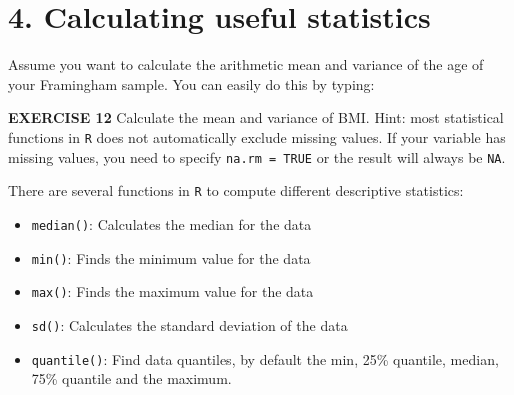 \documentclass[
]{article}
\newenvironment{Shaded}{\begin{snugshade}}{\end{snugshade}}
\newcommand{\CommentTok}[1]{\textcolor[rgb]{0.56,0.35,0.01}{\textit{#1}}}
\newcommand{\DataTypeTok}[1]{\textcolor[rgb]{0.13,0.29,0.53}{#1}}
\newcommand{\KeywordTok}[1]{\textcolor[rgb]{0.13,0.29,0.53}{\textbf{#1}}}
\newcommand{\NormalTok}[1]{#1}
\newcommand{\OperatorTok}[1]{\textcolor[rgb]{0.81,0.36,0.00}{\textbf{#1}}}
\newcommand{\OtherTok}[1]{\textcolor[rgb]{0.56,0.35,0.01}{#1}}
\providecommand{\tightlist}{%
  \setlength{\itemsep}{0pt}\setlength{\parskip}{0pt}}
\begin{document}
\hypertarget{calculating-useful-statistics}{%
\section{4. Calculating useful
statistics}\label{calculating-useful-statistics}}

Assume you want to calculate the arithmetic mean and variance of the age
of your Framingham sample. You can easily do this by typing:

\begin{Shaded}
\end{Shaded}

\textbf{EXERCISE 12} Calculate the mean and variance of BMI. Hint: most
statistical functions in \texttt{R} does not automatically exclude
missing values. If your variable has missing values, you need to specify
\texttt{na.rm\ =\ TRUE} or the result will always be \texttt{NA}.

\begin{Shaded}
\end{Shaded}

There are several functions in \texttt{R} to compute different
descriptive statistics:

\begin{itemize}
\tightlist
\item
  \texttt{median()}: Calculates the median for the data
\item
  \texttt{min()}: Finds the minimum value for the data
\item
  \texttt{max()}: Finds the maximum value for the data
\item
  \texttt{sd()}: Calculates the standard deviation of the data
\item
  \texttt{quantile()}: Find data quantiles, by default the min, 25\%
  quantile, median, 75\% quantile and the maximum.
\end{itemize}
\end{document}
